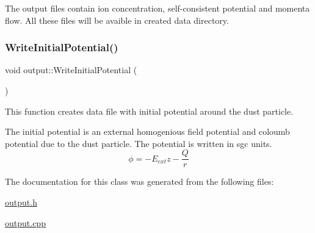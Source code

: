 The output files contain ion concentration, self-\/consistent potential and momenta flow. All these files will be avaible in created data directory. \mbox{\label{classoutput_ade7c2bfb9b6276529405d60ed59e5fb1}} 
\subsubsection{\texorpdfstring{Write\+Initial\+Potential()}{WriteInitialPotential()}}
{\footnotesize\ttfamily void output\+::\+Write\+Initial\+Potential (\begin{DoxyParamCaption}{ }\end{DoxyParamCaption})}



This function creates data file with initial potential around the dust particle. 

The initial potential is an external homogenious field potential and coloumb potential due to the dust particle. The potential is written in sgc units. \[ \phi = - E_{ext}z - \frac{Q}{r} \] 

The documentation for this class was generated from the following files\+:\begin{DoxyCompactItemize}
\item 
\mbox{\hyperlink{output_8h}{output.\+h}}\item 
\mbox{\hyperlink{output_8cpp}{output.\+cpp}}\end{DoxyCompactItemize}
